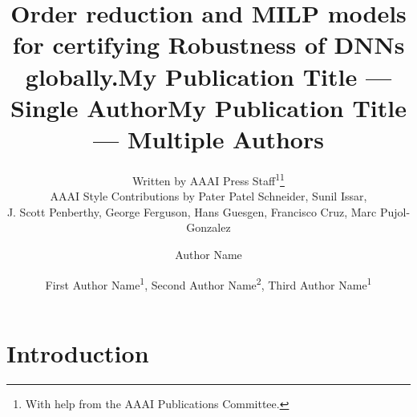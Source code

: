 \documentclass[letterpaper]{article} %
\title{Order reduction and MILP models for certifying Robustness of DNNs globally.}
\date{}
\author{
	Written by AAAI Press Staff\textsuperscript{\rm 1}\thanks{With help from the AAAI Publications Committee.}\\
	AAAI Style Contributions by Pater Patel Schneider,
	Sunil Issar,\\
	J. Scott Penberthy,
	George Ferguson,
	Hans Guesgen,
	Francisco Cruz\equalcontrib,
	Marc Pujol-Gonzalez\equalcontrib
}
\title{My Publication Title --- Single Author}
\author {
	Author Name
}
\title{My Publication Title --- Multiple Authors}
\author {
	First Author Name\textsuperscript{\rm 1},
	Second Author Name\textsuperscript{\rm 2},
	Third Author Name\textsuperscript{\rm 1}
}
\begin{document}
	
	\maketitle
	
	\begin{abstract}
		
		\iffalse
		Most DNNs are brittle to small perturbations. Extensive works have thus been performed to verify robustness for DNNs.
		However, these works mostly consider local robustness, i.e. in the neighborhood of an image.
		While local robustness is useful to have an idea how often non robust images happen, by repeating the verification on 1000 or 10000 pre-obtained images, the main shortcoming is that we have no guarantee that a specific new incoming image, e.g. in a video feed, is robust: The verification process takes too long and requires too much resources to be performed online on embedded systems.
		
		In this paper, we consider {\em global} robustness, that is, guarantees not restricted to a set of local images. For that, we consider {\em bounds} on the switch of values between the different decision classes of a DNN due to a given perturbation. 
		The verification question is much harder than local robustness, as the number of complex variables doubles (from the deviation image to the image and its deviation).
		Further, the values each neuron can take is no more in a small neighborhood.
		Therefore, the global verification process is very complex.
		To obtain useable bounds, we develop several novel partial MILP models for global robustness, with different trade-offs. Last, we use order reduction techniques to reduce the space of images considered, avoiding unrealistic inputs, by using linear PCA. 
		This results into usable bounds, allowing in real time to certify robustness for $87\%$ of incoming images in the MNIST benchmark for a L1-perturbation of $0.5$, as well as for a surrogate computing the hidden plastic strain associated to a deformation map of a pipe.
		\fi
	\end{abstract}
	
	
	\section{Introduction}
	
	
	
	
	
	
	
	
	
\end{document}
